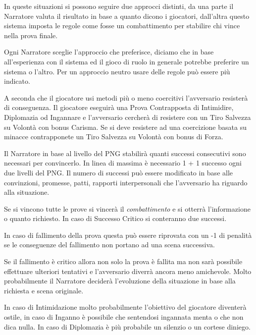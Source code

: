 \begin{multicols}{2}
In queste situazioni si possono seguire due approcci distinti, da una parte il Narratore valuta il risultato in base a quanto dicono i giocatori, dall'altra questo sistema imposta le regole come fosse un combattimento per stabilire chi vince nella prova finale.

Ogni Narratore sceglie l'approccio che preferisce, diciamo che in base all'esperienza con il sistema ed il gioco di ruolo in generale potrebbe preferire un sistema o l'altro. Per un approccio neutro usare delle regole può essere più indicato.

A seconda che il giocatore usi metodi più o meno coercitivi l'avversario resisterà di conseguenza.
Il giocatore eseguirà una Prova Contrapposta di Intimidire, Diplomazia od Ingannare e l'avversario cercherà di resistere con un Tiro Salvezza su Volontà con bonus Carisma.
Se si deve resistere ad una coercizione basata su minacce contrapponete un Tiro Salvezza su Volontà con bonus di Forza.

Il Narratore in base al livello del PNG stabilirà quanti successi consecutivi sono necessari per convincerlo. In linea di massima è necessario 1 + 1 successo ogni due livelli del PNG. Il numero di successi può essere modificato in base alle convinzioni, promesse, patti, rapporti interpersonali che l'avversario ha riguardo alla situazione.

Se si vincono tutte le prove si vincerà il \emph{combattimento} e si otterrà l'informazione o quanto richiesto. In caso di Successo Critico si conteranno due successi.

In caso di fallimento della prova questa può essere riprovata con un -1 di penalità se le conseguenze del fallimento non portano ad una scena successiva.

\begin{figure}

\centering
\end{figure}

Se il fallimento è critico allora non solo la prova è fallita ma non sarà possibile effettuare ulteriori tentativi e l'avversario diverrà ancora meno amichevole. Molto probabilmente il Narratore deciderà l'evoluzione della situazione in base alla richiesta e scena originale.

In caso di Intimidazione molto probabilmente l'obiettivo del giocatore diventerà ostile, in caso di Inganno è possibile che sentendosi ingannata menta o che non dica nulla. In caso di Diplomazia è più probabile un silenzio o un cortese diniego.


\end{multicols}
